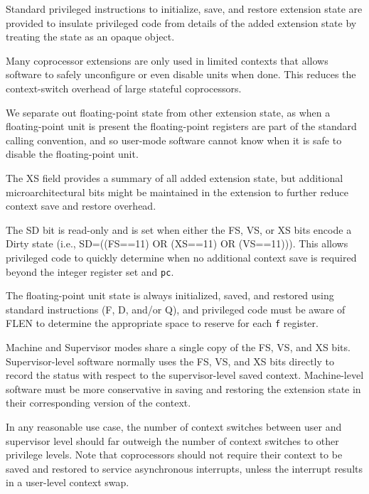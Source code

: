 Standard privileged instructions to initialize, save, and restore
extension state are provided to insulate privileged code from details
of the added extension state by treating the state as an opaque
object.

\begin{commentary}
Many coprocessor extensions are only used in limited contexts that
allows software to safely unconfigure or even disable units when done.
This reduces the context-switch overhead of large stateful
coprocessors.

We separate out floating-point state from other extension state, as
when a floating-point unit is present the floating-point registers are
part of the standard calling convention, and so user-mode software
cannot know when it is safe to disable the floating-point unit.
\end{commentary}

The XS field provides a summary of all added extension state, but
additional microarchitectural bits might be maintained in the
extension to further reduce context save and restore overhead.

The SD bit is read-only and is set when either the FS, VS, or XS bits
encode a Dirty state (i.e., SD=((FS==11) OR (XS==11) OR (VS==11))).  This allows
privileged code to quickly determine when no additional context save is
required beyond the integer register set and {\tt pc}.

The floating-point unit state is always initialized, saved, and
restored using standard instructions (F, D, and/or Q), and privileged
code must be aware of FLEN to determine the appropriate space to
reserve for each {\tt f} register.

Machine and Supervisor modes share a single copy of the FS, VS, and XS bits.
Supervisor-level software
normally uses the FS, VS, and XS bits directly to record the status with
respect to the supervisor-level saved context.
Machine-level software must be more conservative in saving and restoring the
extension state in their corresponding version of the context.

\begin{commentary}
In any reasonable use case, the number of context switches between
user and supervisor level should far outweigh the number of context
switches to other privilege levels.  Note that coprocessors should not
require their context to be saved and restored to service asynchronous
interrupts, unless the interrupt results in a user-level context swap.
\end{commentary}

